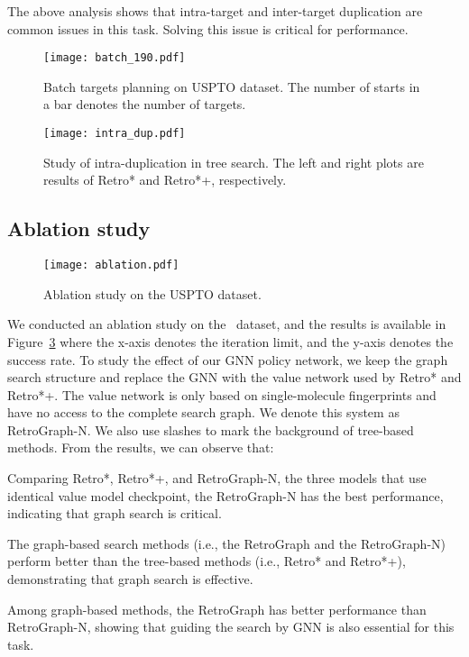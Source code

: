 \documentclass[sigconf]{acmart}
\begin{document}
The above analysis shows that intra-target and inter-target duplication are common issues in this task.
Solving this issue is critical for performance.

\begin{figure}[!tb]
    \centering
    \texttt{[image: batch\_190.pdf]}
    \caption{Batch targets planning on USPTO dataset. The number of starts in a bar denotes the number of targets.}
    \label{fig:batch_190}
\end{figure}

\begin{figure}[!htbp]
    \centering
    \texttt{[image: intra\_dup.pdf]}
\caption{Study of intra-duplication in tree search. The left and right plots are results of Retro* and Retro*+, respectively.}
    \label{fig:dup}
\end{figure}


\subsection{Ablation study}\label{sec:res_ablation}
\begin{figure}[!htbp]
    \centering
    \texttt{[image: ablation.pdf]}
    \caption{Ablation study on the USPTO dataset.}
    \label{fig:ablation}
\end{figure}

We conducted an ablation study on the \uspto~dataset, and the results is available in Figure~\ref{fig:ablation} where the x-axis denotes the iteration limit, and the y-axis denotes the success rate.
To study the effect of our GNN policy network, we keep the graph search structure and replace the GNN with the value network used by Retro* and Retro*+.
The value network is only based on single-molecule fingerprints and have no access to the complete search graph.
We denote this system as RetroGraph-N.
We also use slashes to mark the background of tree-based methods.
From the results, we can observe that:

\noindent Comparing Retro*, Retro*+, and RetroGraph-N, the three models that use identical value model checkpoint, the RetroGraph-N has the best performance, indicating that graph search is critical. 

\noindent The graph-based search methods (i.e., the RetroGraph and the RetroGraph-N) perform better than the tree-based methods (i.e., Retro* and  Retro*+), demonstrating that graph search is effective.

\noindent Among graph-based methods, the RetroGraph has better performance than RetroGraph-N, showing that guiding the search by GNN is also essential for this task.
\end{document}
